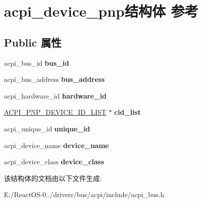 \hypertarget{structacpi__device__pnp}{}\section{acpi\+\_\+device\+\_\+pnp结构体 参考}
\label{structacpi__device__pnp}
\subsection*{Public 属性}
\begin{DoxyCompactItemize}
\item 
\mbox{\label{structacpi__device__pnp_ab046438ffbdbecae5e377026795657a7}} 
acpi\+\_\+bus\+\_\+id {\bfseries bus\+\_\+id}
\item 
\mbox{\label{structacpi__device__pnp_a63bc51b0ee1c135e03cdb5cf37d7be2c}} 
acpi\+\_\+bus\+\_\+address {\bfseries bus\+\_\+address}
\item 
\mbox{\label{structacpi__device__pnp_a5fff8c7a01e45fe75c35020545d935ff}} 
acpi\+\_\+hardware\+\_\+id {\bfseries hardware\+\_\+id}
\item 
\mbox{\label{structacpi__device__pnp_a773fba3c50ecf274bae4b8e2d8469d70}} 
\hyperlink{structacpi__pnp__device__id__list}{A\+C\+P\+I\+\_\+\+P\+N\+P\+\_\+\+D\+E\+V\+I\+C\+E\+\_\+\+I\+D\+\_\+\+L\+I\+ST} $\ast$ {\bfseries cid\+\_\+list}
\item 
\mbox{\label{structacpi__device__pnp_a12e50cc69cce13059a9ec9a6dda471a7}} 
acpi\+\_\+unique\+\_\+id {\bfseries unique\+\_\+id}
\item 
\mbox{\label{structacpi__device__pnp_a93f79adab4ebf64ea7292589c1941eb7}} 
acpi\+\_\+device\+\_\+name {\bfseries device\+\_\+name}
\item 
\mbox{\label{structacpi__device__pnp_afd9e39ed9efb8efa0428616b17ca2fd4}} 
acpi\+\_\+device\+\_\+class {\bfseries device\+\_\+class}
\end{DoxyCompactItemize}


该结构体的文档由以下文件生成\+:\begin{DoxyCompactItemize}
\item 
E\+:/\+React\+O\+S-\/0../drivers/bus/acpi/include/acpi\+\_\+bus.\+h\end{DoxyCompactItemize}
